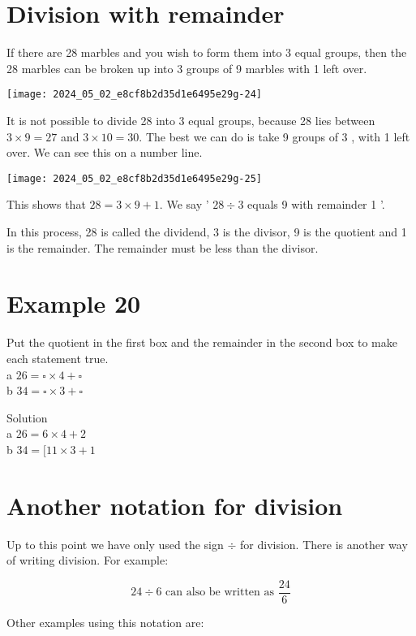 \documentclass[10pt]{article}
\begin{document}
\section*{Division with remainder}
If there are 28 marbles and you wish to form them into 3 equal groups, then the 28 marbles can be broken up into 3 groups of 9 marbles with 1 left over.

\begin{center}
\texttt{[image: 2024\_05\_02\_e8cf8b2d35d1e6495e29g-24]}
\end{center}

It is not possible to divide 28 into 3 equal groups, because 28 lies between \(3 \times 9=27\) and \(3 \times 10=30\). The best we can do is take 9 groups of 3 , with 1 left over. We can see this on a number line.

\begin{center}
\texttt{[image: 2024\_05\_02\_e8cf8b2d35d1e6495e29g-25]}
\end{center}

This shows that \(28=3 \times 9+1\). We say ' \(28 \div 3\) equals 9 with remainder 1 '.

In this process, 28 is called the dividend, 3 is the divisor, 9 is the quotient and 1 is the remainder. The remainder must be less than the divisor.

\section*{Example 20}
Put the quotient in the first box and the remainder in the second box to make each statement true.\\
a \(26=\square \times 4+\square\)\\
b \(34=\square \times 3+\square\)

Solution\\
a \(26=6 \times 4+2\)\\
b \(34=[11 \times 3+1\)

\section*{Another notation for division}
Up to this point we have only used the sign \(\div\) for division. There is another way of writing division. For example:

\[
24 \div 6 \text { can also be written as } \frac{24}{6}
\]

Other examples using this notation are:
\end{document}
